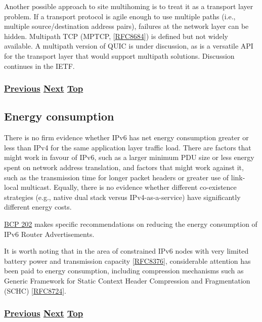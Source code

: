 \documentclass[
]{article}
\begin{document}
Another possible approach to site multihoming is to treat it as a
transport layer problem. If a transport protocol is agile enough to use
multiple paths (i.e., multiple source/destination address pairs),
failures at the network layer can be hidden. Multipath TCP (MPTCP,
{[}\href{https://www.rfc-editor.org/info/rfc8684}{RFC8684}{]}) is
defined but not widely available. A multipath version of QUIC is under
discussion, as is a versatile API for the transport layer that would
support multipath solutions. Discussion continues in the IETF.

\subsubsection{\texorpdfstring{\hyperref[multi-prefix-operation]{Previous}
\hyperref[energy-consumption]{Next}
\hyperref[management-and-operations]{Top}}{Previous Next Top}}\label{previous-next-top-32}

\pagebreak

\subsection{Energy consumption}\label{energy-consumption}

There is no firm evidence whether IPv6 has net energy consumption
greater or less than IPv4 for the same application layer traffic load.
There are factors that might work in favour of IPv6, such as a larger
minimum PDU size or less energy spent on network address translation,
and factors that might work against it, such as the transmission time
for longer packet headers or greater use of link-local multicast.
Equally, there is no evidence whether different co-existence strategies
(e.g., native dual stack versus IPv4-as-a-service) have significantly
different energy costs.

\href{https://www.rfc-editor.org/info/bcp202}{BCP 202} makes specific
recommendations on reducing the energy consumption of IPv6 Router
Advertisements.

It is worth noting that in the area of constrained IPv6 nodes with very
limited battery power and transmission capacity
{[}\href{https://www.rfc-editor.org/info/rfc8376}{RFC8376}{]},
considerable attention has been paid to energy consumption, including
compression mechanisms such as Generic Framework for Static Context
Header Compression and Fragmentation (SCHC)
{[}\href{https://www.rfc-editor.org/info/rfc8724}{RFC8724}{]}.

\subsubsection{\texorpdfstring{\hyperref[multihoming]{Previous}
\hyperref[packet-size-and-jumbo-frames]{Next}
\hyperref[management-and-operations]{Top}}{Previous Next Top}}\label{previous-next-top-33}
\end{document}
